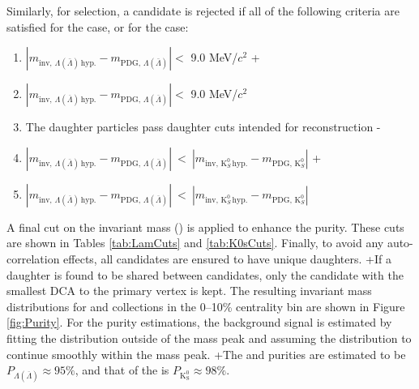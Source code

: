  Similarly, for \Ks selection, a candidate is rejected if all of the following criteria are satisfied for the \Lam case, or for the \ALam case:
 \begin{enumerate}
- \item $\left|m_{\mathrm{inv},\,\Lambda(\bar{\Lambda})\,\mathrm{hyp.}} - m_{\mathrm{PDG},\,\Lambda(\bar{\Lambda})}\right| < $ 9.0 MeV/$c^{2}$
+ \item $\left|m_{\mathrm{inv},\,\Lambda(\overline{\Lambda})\,\mathrm{hyp.}} - m_{\mathrm{PDG},\,\Lambda(\overline{\Lambda})}\right| < $ 9.0 MeV/$c^{2}$
  \item The daughter particles pass daughter cuts intended for \LamALam reconstruction
- \item $\left|m_{\mathrm{inv},\,\Lambda(\bar{\Lambda})\,\mathrm{hyp.}} - m_{\mathrm{PDG},\,\Lambda(\bar{\Lambda})}\right|~ < ~\left|m_{\mathrm{inv},\,\mathrm{K}^{0}_{S}\,\mathrm{hyp.}} - m_{\mathrm{PDG},\,\mathrm{K}^{0}_{S}}\right|$
+ \item $\left|m_{\mathrm{inv},\,\Lambda(\overline{\Lambda})\,\mathrm{hyp.}} - m_{\mathrm{PDG},\,\Lambda(\overline{\Lambda})}\right|~ < ~\left|m_{\mathrm{inv},\,\mathrm{K}^{0}_{S}\,\mathrm{hyp.}} - m_{\mathrm{PDG},\,\mathrm{K}^{0}_{S}}\right|$
 \end{enumerate} 
 
 A final cut on the invariant mass (\minv) is applied to enhance the purity.
 These cuts are shown in Tables \ref{tab:LamCuts} and \ref{tab:K0sCuts}.
 Finally, to avoid any auto-correlation effects, all \Vz candidates are ensured to have unique daughters. 
\sout{\color{red}{If a daughter is found to be shared between \Vz candidates, the candidate with the smallest DCA to the primary vertex is kept, while the others are removed.}}
+If a daughter is found to be shared between \Vz candidates, only the candidate with the smallest DCA to the primary vertex is kept.
 The resulting invariant mass distributions for \Lam and \Ks collections in the 0--10\% centrality bin are shown in Figure \ref{fig:Purity}.
 For the purity estimations, the background signal is estimated by fitting the \minv distribution outside of the mass peak and assuming the distribution to continue smoothly within the mass peak.
\sout{\color{red}{The \Lam and \ALam purities are estimated to be 95\%, and that of the \Ks is 98\%.}}
+The \Lam and \ALam purities are estimated to be $P_{\Lambda(\overline{\Lambda})} \approx 95\%$, and that of the \Ks is $P_{\mathrm{K^{0}_{S}}} \approx 98\%$.
 
